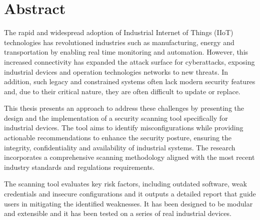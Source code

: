 \chapter*{Abstract} %
\label{abtract}


The rapid and widespread adoption of Industrial Internet of Things (IIoT) technologies has revolutioned industries such as manufacturing, energy and transportation by enabling real time monitoring and automation. However, this increased connectivity has expanded the attack surface for cyberattacks, exposing industrial devices and operation technologies networks to new threats. In addition, such legacy and constrained systems often lack modern security features and, due to their critical nature, they are often difficult to update or replace.

This thesis presents an approach to address these challenges by presenting the design and the implementation of a security scanning tool specifically for industrial devices. The tool aims to identify misconfigurations while providing actionable recommendations to enhance the security posture, ensuring the integrity, confidentiality and availability of industrial systems. The research incorporates a comprehensive scanning methodology aligned with the most recent industry standards and regulations requirements.

The scanning tool evaluates key risk factors, including outdated software, weak credentials and insecure configurations and it outputs a detailed report that guide users in mitigating the identified weaknesses. It has been designed to be modular and extensible and it has been tested on a series of real industrial devices.
